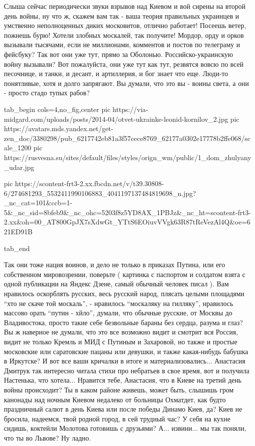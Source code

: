 Слыша сейчас
периодически звуки взрывов над Киевом и вой сирены на второй день войны, ну что
ж, скажем вам так - ваша теория правильных украинцев и умственно неполноценных
диких московитов, отлично работает!  Посеешь ветер, пожнешь бурю!  Хотели
злобных москалей, так получите! Мордор, орду и орков вызывали тысячами, если не
миллионами, комментов и постов по телеграму и фейсбуку? Так вот они уже тут,
прямо за Оболонью.
Российско-украинскую войну вызывали? Вот пожалуйста, они уже тут как тут,
резвятся вовсю по всей песочнице, и танки, и десант, и артиллерия, и бог знает
что еще. Люди-то понятливые, хотя и долго запрягают. Вы думали, что это вы -
воины света, а они - просто стадо тупых рабов? 

\ifcmt
  tab_begin cols=4,no_fig,center
     pic https://via-midgard.com/uploads/posts/2014-04/otvet-ukrainke-leonid-kornilov_2.jpg
     pic https://avatars.mds.yandex.net/get-zen_doc/3380298/pub_6217742eb81a3f57cece8769_62177a0302e17778b2ffe068/scale_1200
		 pic https://rusvesna.su/sites/default/files/styles/orign_wm/public/1_dom_zhulyany_udar.jpg

     pic https://scontent-frt3-2.xx.fbcdn.net/v/t39.30808-6/274681293_5532411990106883_4041197137484819698_n.jpg?_nc_cat=101&ccb=1-5&_nc_sid=8bfeb9&_nc_ohc=5203f8z5YD8AX_1PBJz&_nc_ht=scontent-frt3-2.xx&oh=00_AT800GpJX7sXdwGt_YTtS6EOiuvVVgk63R87tReVezAl4Q&oe=621ED91B

  tab_end
\fi

Так они тоже нация воинов, и дело не только в приказах Путина, или его
собственном мировозрении, поверьте ( картинка с паспортом и солдатом взята с
одной публикации на Яндекс Дзене, самый обычный человек писал ). Вам нравилось
оскорблять русских, весь русский народ, плясать целыми площадями \enquote{хто
не скаче той москаль}, - нравилось \enquote{москаляку на гилляку}, нравилось
массово орать \enquote{путин - хйло}, думали, что обычные русские, от Москвы до
Владивостока, просто такие себе безвольные бараны без сердца, разума и глаз? Вы
ж наверное не думали, что это все возможно видит и смотрит вся Россия, видит не
только Кремль и МИД с Путиным и Захаровой, но также и простые московские или
саратовские пацаны или девушки, и также какая-нибудь бабушка в Иркутске? И вот
все ваши кричалки в итоге и материализовались... Анастасия Дмитрук так
интересно читала стихи про небратьев в свое время, вот и получила Настенька,
что хотела... Нравится тебе, Анастасия, что в Киеве на третий день войны
происходит? Ты в каком районе живешь, может быть, слышишь гром канонады над
ночным Киевом недалеко от больницы Охматдет, как будто праздничный салют в день
Киева или после победы Динамо Киев, да? Киев не бросила, надеемся, твой родной
город, в сей трудный час? У себя на кухне сидишь, коктейли Молотова готовишь с
друзьями? А... извини... мы так поняли, что ты во Львове? Ну ладно.

